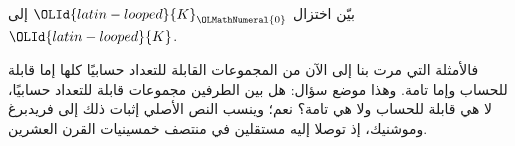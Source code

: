 \documentclass[../../../include/open-logic-section]{subfiles}
\begin{document}
\begin{prob}
بيّن اختزال ${\OLId{latin-looped}{K}}_{\OLMathNumeral{0}}$ إلى ${\OLId{latin-looped}{K}}$.
\end{prob}

\begin{digress}
فالأمثلة التي مرت بنا إلى الآن من المجموعات القابلة للتعداد حسابيًا
كلها إما قابلة للحساب وإما تامة. وهذا موضع سؤال:{}
هل بين الطرفين مجموعات قابلة للتعداد حسابيًا، لا هي قابلة للحساب ولا
هي تامة؟ نعم؛ وينسب النص الأصلي إثبات ذلك إلى فريدبرغ وموشنيك، إذ توصلا إليه مستقلين في
منتصف خمسينيات القرن العشرين.
\end{digress}
\end{document}
